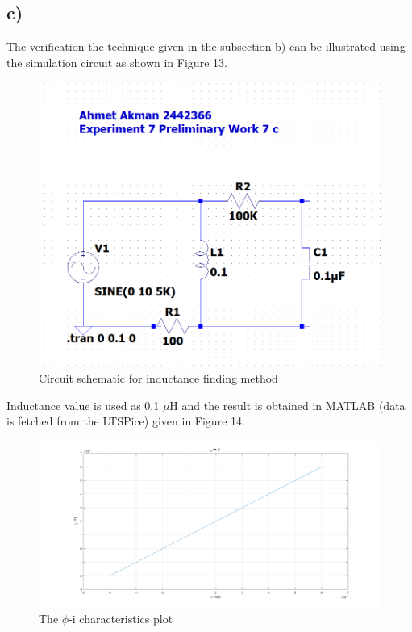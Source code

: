 \documentclass[letterpaper,12pt]{article}
\begin{document}
\subsection{c)}
The verification the technique given in the subsection b) can be illustrated using the simulation circuit as shown in Figure 13.
\begin{figure}[H]
	\centering
   \includegraphics[width=1\textwidth]{Pre7c_sch.png}
   \caption{Circuit schematic for inductance finding method}
\end{figure} 
Inductance value is used as 0.1 \(\mu\)H and the result is obtained in MATLAB (data is fetched from the LTSPice) given in Figure 14.
\begin{figure}[H]
	\centering
   \includegraphics[width=1\textwidth]{PRE_7c.png}
   \caption{The \(\phi\)-i characteristics plot}
\end{figure} 
\end{document}
